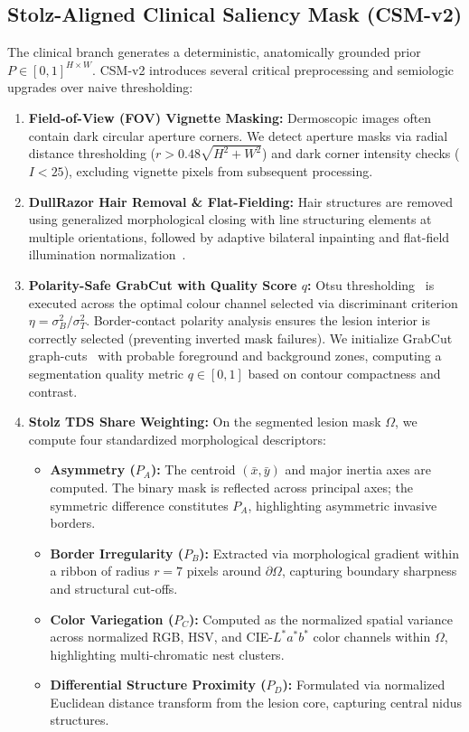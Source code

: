 \documentclass[11pt,a4paper]{article}
\begin{document}
\subsection{Stolz-Aligned Clinical Saliency Mask (CSM-v2)}
\label{sec:csm_v2}
The clinical branch generates a deterministic, anatomically grounded prior $P \in [0, 1]^{H \times W}$. CSM-v2 introduces several critical preprocessing and semiologic upgrades over naive thresholding:
\begin{enumerate}
    \item \textbf{Field-of-View (FOV) Vignette Masking:} Dermoscopic images often contain dark circular aperture corners. We detect aperture masks via radial distance thresholding ($r > 0.48\sqrt{H^2+W^2}$) and dark corner intensity checks ($I < 25$), excluding vignette pixels from subsequent processing.
    \item \textbf{DullRazor Hair Removal \& Flat-Fielding:} Hair structures are removed using generalized morphological closing with line structuring elements at multiple orientations, followed by adaptive bilateral inpainting and flat-field illumination normalization~\cite{lee1997dullrazor}.
    \item \textbf{Polarity-Safe GrabCut with Quality Score $q$:} Otsu thresholding~\cite{otsu1979threshold} is executed across the optimal colour channel selected via discriminant criterion $\eta = \sigma_B^2 / \sigma_T^2$. Border-contact polarity analysis ensures the lesion interior is correctly selected (preventing inverted mask failures). We initialize GrabCut graph-cuts~\cite{rother2004grabcut} with probable foreground and background zones, computing a segmentation quality metric $q \in [0, 1]$ based on contour compactness and contrast.
    \item \textbf{Stolz TDS Share Weighting:} On the segmented lesion mask $\Omega$, we compute four standardized morphological descriptors:
    \begin{itemize}
        \item \textbf{Asymmetry ($P_A$):} The centroid $(\bar{x}, \bar{y})$ and major inertia axes are computed. The binary mask is reflected across principal axes; the symmetric difference constitutes $P_A$, highlighting asymmetric invasive borders.
        \item \textbf{Border Irregularity ($P_B$):} Extracted via morphological gradient within a ribbon of radius $r = 7$ pixels around $\partial \Omega$, capturing boundary sharpness and structural cut-offs.
        \item \textbf{Color Variegation ($P_C$):} Computed as the normalized spatial variance across normalized RGB, HSV, and CIE-$L^*a^*b^*$ color channels within $\Omega$, highlighting multi-chromatic nest clusters.
        \item \textbf{Differential Structure Proximity ($P_D$):} Formulated via normalized Euclidean distance transform from the lesion core, capturing central nidus structures.
    \end{itemize}
\end{enumerate}
\end{document}
